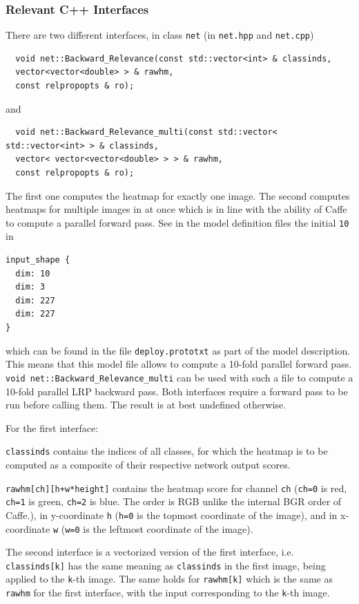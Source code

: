 \documentclass[a4wide]{article}
\begin{document}
\begin{itemize}
\subsubsection*{Relevant C++ Interfaces}
There are two different interfaces, in class \texttt{net} (in \texttt{net.hpp} and  \texttt{net.cpp})
\begin{verbatim}
  void net::Backward_Relevance(const std::vector<int> & classinds,
  vector<vector<double> > & rawhm,
  const relpropopts & ro);
\end{verbatim}
and
\begin{verbatim}
  void net::Backward_Relevance_multi(const std::vector< std::vector<int> > & classinds,
  vector< vector<vector<double> > > & rawhm,
  const relpropopts & ro);
\end{verbatim}

The first one computes the heatmap for exactly one image. The second computes heatmaps for multiple images in at once which is in line with the ability of Caffe to compute a parallel forward pass. See in the model definition files the initial \texttt{10} in
\begin{verbatim}
input_shape {
  dim: 10
  dim: 3
  dim: 227
  dim: 227
}
\end{verbatim}
which can be found in the file \texttt{deploy.prototxt} as part of the model description.
This means that this model file allows to compute a 10-fold parallel forward pass. \texttt{void net::Backward\_Relevance\_multi} can be used with such a file to compute a 10-fold parallel LRP backward pass.
Both interfaces require a forward pass to be run before calling them. The result is at best undefined otherwise.



For the first interface:

 \texttt{classinds} contains the indices of all classes, for which the heatmap is to be computed as a composite of their respective network output scores.

\texttt{rawhm[ch][h+w*height]} contains the heatmap score for channel \texttt{ch} (\texttt{ch=0} is red, \texttt{ch=1} is green, \texttt{ch=2} is blue. The order is RGB unlike the internal BGR order of Caffe.), in y-coordinate \texttt{h} (\texttt{h=0} is the topmost coordinate of the image), and in x-coordinate \texttt{w} (\texttt{w=0} is the leftmost coordinate of the image).


The second interface is a vectorized version of the first interface, i.e. \texttt{classinds[k]} has the same meaning as \texttt{classinds} in the first image, being applied to the \texttt{k}-th image. The same holds for \texttt{rawhm[k]} which is the same as \texttt{rawhm} for the first interface, with the input corresponding to the \texttt{k}-th image.


\end{itemize}
\end{document}
